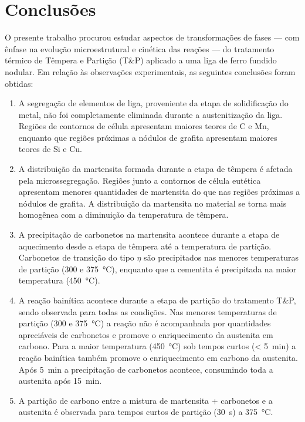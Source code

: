\chapter{Conclusões}

O presente trabalho procurou estudar aspectos de transformações de fases --- com ênfase na evolução microestrutural e cinética das reações --- do tratamento térmico de Têmpera e Partição (T\&P) aplicado a uma liga de ferro fundido nodular. Em relação às observações experimentais, as seguintes conclusões foram obtidas:

\begin{enumerate}
  \item A segregação de elementos de liga, proveniente da etapa de solidificação do metal, não foi completamente eliminada durante a austenitização da liga. Regiões de contornos de célula apresentam maiores teores de C e Mn, enquanto que regiões próximas a nódulos de grafita apresentam maiores teores de Si e Cu.

  \item A distribuição da martensita formada durante a etapa de têmpera é afetada pela microssegregação. Regiões junto a contornos de célula eutética apresentam menores quantidades de martensita do que nas regiões próximas a nódulos de grafita. A distribuição da martensita no material se torna mais homogênea com a diminuição da temperatura de têmpera.

  \item A precipitação de carbonetos na martensita acontece durante a etapa de aquecimento desde a etapa de têmpera até a temperatura de partição. Carbonetos de transição do tipo $\eta$ são precipitados nas menores temperaturas de partição (300 e \SI{375}{\degreeCelsius}), enquanto que a cementita é precipitada na maior temperatura (\SI{450}{\degreeCelsius}).

  \item A reação bainítica acontece durante a etapa de partição do tratamento T\&P, sendo observada para todas as condições. Nas menores temperaturas de partição (300 e \SI{375}{\degreeCelsius}) a reação não é acompanhada por quantidades apreciáveis de carbonetos e promove o enriquecimento da austenita em carbono. Para a maior temperatura (\SI{450}{\degreeCelsius}) sob tempos curtos (< 5~min) a reação bainítica também promove o enriquecimento em carbono da austenita. Após 5~min a precipitação de carbonetos acontece, consumindo toda a austenita após 15~min.

  \item A partição de carbono entre a mistura de martensita + carbonetos e a austenita é observada para tempos curtos de partição (30~s) a \SI{375}{\degreeCelsius}.


\end{enumerate}

